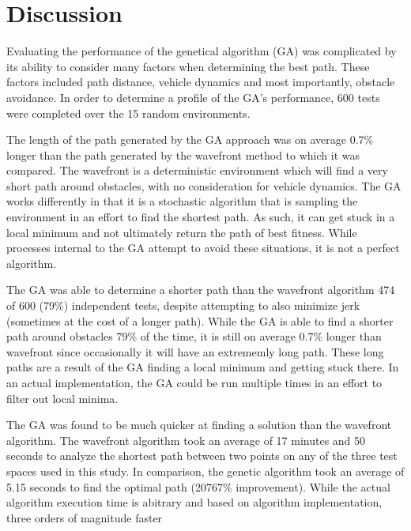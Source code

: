 	
	
\section{Discussion}

Evaluating the performance of the genetical algorithm (GA) was complicated by its ability to consider many factors when determining the best path. These factors included path distance, vehicle dynamics and most importantly, obstacle avoidance. In order to determine a profile of the GA's performance, 600 tests were completed over the 15 random environments.

The length of the path generated by the GA approach was on average 0.7\% longer than the path generated by the wavefront method to which it was compared. The wavefront is a deterministic environment which will find a very short path around obstacles, with no consideration for vehicle dynamics. The GA works differently in that it is a stochastic algorithm that is sampling the environment in an effort to find the shortest path. As such, it can get stuck in a local minimum and not ultimately return the path of best fitness. While processes internal to the GA attempt to avoid these situations, it is not a perfect algorithm.

The GA was able to determine a shorter path than the wavefront algorithm 474 of 600 (79\%) independent tests, despite attempting to also minimize jerk (sometimes at the cost of a longer path). While the GA is able to find a shorter path around obstacles 79\% of the time, it is still on average 0.7\% longer than wavefront since occasionally it will have an extrememly long path. These long paths are a result of the GA finding a local minimum and getting stuck there. In an actual implementation, the GA could be run multiple times in an effort to filter out local minima.

The GA was found to be much quicker at finding a solution than the wavefront algorithm. The wavefront algorithm took an average of 17 minutes and 50 seconds to analyze the shortest path between two points on any of the three test spaces used in this study. In comparison, the genetic algorithm took an average of 5.15 seconds to find the optimal path (20767\% improvement). While the actual algorithm execution time is abitrary and based on algorithm implementation, three orders of magnitude faster 


